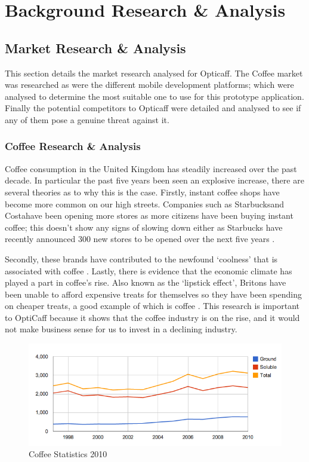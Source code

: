 \section{Background Research \& Analysis}

\subsection{Market Research \& Analysis}
This section details the market research analysed for Opticaff.
The Coffee market was researched as were the different mobile development platforms; which were analysed to determine the most suitable one to use for this prototype application. 
Finally the potential competitors to Opticaff were detailed and analysed to see if any of them pose a genuine threat against it. 

\subsubsection{Coffee Research \& Analysis}
Coffee consumption in the United Kingdom has steadily increased over the past decade. 
In particular the past five years been seen an explosive increase, there are several theories as to why this is the case.
Firstly, instant coffee shops have become more common on our high streets. 
Companies such as Starbucks\texttrademark and Costa\texttrademark have been opening more stores as more citizens have been buying instant coffee; this doesn’t show any signs of slowing down either as Starbucks have recently announced 300 new stores to be opened over the next five years \cite{starbucks}.

Secondly, these brands have contributed to the newfound ‘coolness’ that is associated with coffee \cite{popular}. 
Lastly, there is evidence that the economic climate has played a part in coffee’s rise. 
Also known as the ‘lipstick effect’, Britons have been unable to afford expensive treats for themselves so they have been spending on cheaper treats, a good example of which is coffee \cite{costa}.
This research is important to OptiCaff because it shows that the coffee industry is on the rise, and it would not make business sense for us to invest in a declining industry.

\begin{figure}[ht]
\begin{center}
\includegraphics[trim = 0mm 0mm 0mm 0mm, clip, scale=0.6]{images/CaffeineGraph.png}
\caption{Coffee Statistics 2010 \cite{CoffeeStats}} 
\end{center}
\end{figure}

